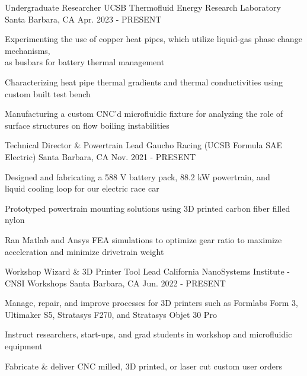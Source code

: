 

\begin{cventries}

\cventry
{Undergraduate Researcher} %
{UCSB Thermofluid Energy Research Laboratory} %
{Santa Barbara, CA} %
{Apr. 2023 - PRESENT} %
{ %
\begin{cvitems}   
\item {Experimenting the use of copper heat pipes, which utilize liquid-gas phase change mechanisms,\\ as busbars for battery thermal management}
\item {Characterizing heat pipe thermal gradients and thermal conductivities using custom built test bench}
\item {Manufacturing a custom CNC'd microfluidic fixture for analyzing the role of surface structures on flow boiling instabilities}
\end{cvitems}
}

\cventry
{Technical Director \& Powertrain Lead} %
{Gaucho Racing (UCSB Formula SAE Electric)} %
{Santa Barbara, CA} %
{Nov. 2021 - PRESENT} %
{ %
\begin{cvitems}   
\item {Designed and fabricating a 588 V battery pack, 88.2 kW powertrain, and \\ liquid cooling loop for our electric race car}
\item {Prototyped powertrain mounting solutions using 3D printed carbon fiber filled nylon}
\item {Ran Matlab and Ansys FEA simulations to optimize gear ratio to maximize acceleration and minimize drivetrain weight}
\end{cvitems}
}


\cventry
{Workshop Wizard \& 3D Printer Tool Lead} %
{California NanoSystems Institute - CNSI Workshops} %
{Santa Barbara, CA} %
{Jun. 2022 - PRESENT} %
{ %
\begin{cvitems}
\item {Manage, repair, and improve processes for 3D printers such as Formlabs Form 3, Ultimaker S5, Stratasys F270, and Stratasys Objet 30 Pro}
\item {Instruct researchers, start-ups, and grad students in workshop and microfluidic equipment}
\item {Fabricate \& deliver CNC milled, 3D printed, or laser cut custom user orders }
\end{cvitems}
}

\end{cventries}
